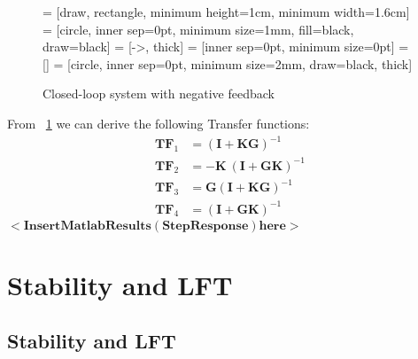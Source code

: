 \documentclass{scrreprt}
\begin{document}
\begin{figure}[htb]
  \centering
       = [draw, rectangle, minimum height=1cm, minimum width=1.6cm]
        = [circle, inner sep=0pt, minimum size=1mm, fill=black, draw=black]
     = [->, thick]
         = [inner sep=0pt, minimum size=0pt]
         = []
           = [circle, inner sep=0pt, minimum size=2mm, draw=black, thick]
	  \caption{Closed-loop system with negative feedback}
    \label{fig:blockDiagram1}
\end{figure}
From ~\ref{fig:blockDiagram1} we can derive the following Transfer functions:
\begin{align*}
\bm{TF}_1 &= (\bm{I}+\bm{K}\bm{G})^{-1} \\
\bm{TF}_2 &= -\bm{K}\:(\bm{I}+\bm{G}\bm{K})^{-1} \\
\bm{TF}_3 &= \bm{G}(\bm{I}+\bm{K}\bm{G})^{-1} \\
\bm{TF}_4 &= (\bm{I}+\bm{G}\bm{K})^{-1} 
\end{align*}
$\bm{<Insert Matlab Results (Step Response) here>}$ 
\chapter{Stability and LFT}
\section{Stability and LFT}
\end{document}
